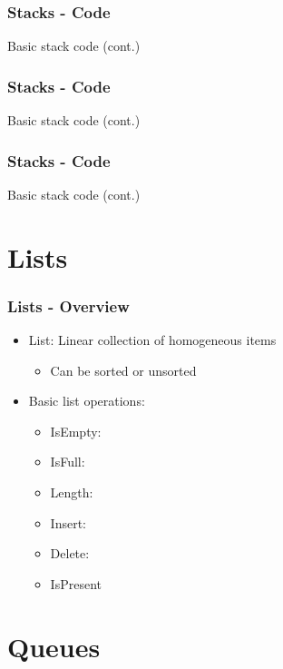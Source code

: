 \documentclass[c, aspectratio=169]{beamer}
\begin{document}
\begin{frame}\frametitle{Stacks - Code}
Basic stack code (cont.)

\end{frame}

\begin{frame}\frametitle{Stacks - Code}
Basic stack code (cont.)

\end{frame}

\begin{frame}\frametitle{Stacks - Code}
Basic stack code (cont.)

\end{frame}

\section{Lists}
\begin{frame}\frametitle{Lists - Overview}
\begin{itemize}
\item List: Linear collection of homogeneous items
	\begin{itemize}
	\item Can be sorted or unsorted
	\end{itemize}
\item Basic list operations:
	\begin{itemize}
	\item IsEmpty: 
	\item IsFull:
	\item Length: 
	\item Insert: 
	\item Delete: 
	\item IsPresent
	\end{itemize}
\end{itemize}
\end{frame}

\begin{frame}\end{frame}
\begin{frame}\end{frame}

\section{Queues}
\begin{frame}\end{frame}
\begin{frame}\end{frame}
\begin{frame}\end{frame}
\end{document}

